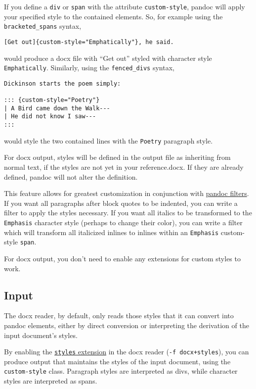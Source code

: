 \documentclass[
]{article}
\begin{document}
If you define a \texttt{div} or \texttt{span} with the attribute
\texttt{custom-style}, pandoc will apply your specified style to the
contained elements. So, for example using the \texttt{bracketed\_spans}
syntax,

\begin{verbatim}
[Get out]{custom-style="Emphatically"}, he said.
\end{verbatim}

would produce a docx file with ``Get out'' styled with character style
\texttt{Emphatically}. Similarly, using the \texttt{fenced\_divs}
syntax,

\begin{verbatim}
Dickinson starts the poem simply:

::: {custom-style="Poetry"}
| A Bird came down the Walk---
| He did not know I saw---
:::
\end{verbatim}

would style the two contained lines with the \texttt{Poetry} paragraph
style.

For docx output, styles will be defined in the output file as inheriting
from normal text, if the styles are not yet in your reference.docx. If
they are already defined, pandoc will not alter the definition.

This feature allows for greatest customization in conjunction with
\href{http://pandoc.org/filters.html}{pandoc filters}. If you want all
paragraphs after block quotes to be indented, you can write a filter to
apply the styles necessary. If you want all italics to be transformed to
the \texttt{Emphasis} character style (perhaps to change their color),
you can write a filter which will transform all italicized inlines to
inlines within an \texttt{Emphasis} custom-style \texttt{span}.

For docx output, you don't need to enable any extensions for custom
styles to work.

\hypertarget{input}{%
\subsection{Input}\label{input}}

The docx reader, by default, only reads those styles that it can convert
into pandoc elements, either by direct conversion or interpreting the
derivation of the input document's styles.

By enabling the \protect\hyperlink{ext-styles}{\texttt{styles}
extension} in the docx reader (\texttt{-f\ docx+styles}), you can
produce output that maintains the styles of the input document, using
the \texttt{custom-style} class. Paragraph styles are interpreted as
divs, while character styles are interpreted as spans.
\end{document}
